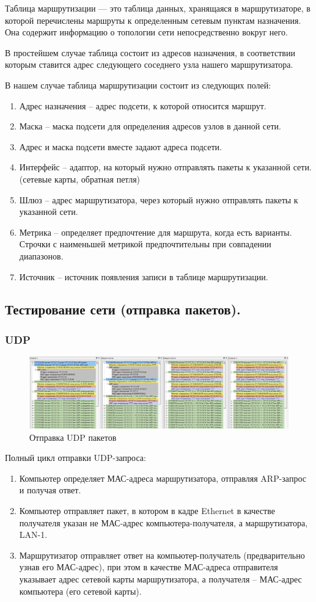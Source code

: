 \documentclass[12pt,onecolumn]{article}
\begin{document}
Таблица маршрутизации — это таблица данных, хранящаяся в маршрутизаторе, в которой перечислены маршруты к определенным сетевым пунктам назначения. Она содержит информацию о топологии сети непосредственно вокруг него.

В простейшем случае таблица состоит из адресов назначения, в соответствии которым ставится адрес следующего соседнего узла нашего маршрутизатора.

В нашем случае таблица маршрутизации состоит из следующих полей:
\begin{enumerate}
  \item Адрес назначения -- адрес подсети, к которой относится маршрут.
  \item Маска -- маска подсети для определения адресов узлов в данной сети.
  \item Адрес и маска подсети вместе задают адреса подсети.
  \item Интерфейс -- адаптор, на который нужно отправлять пакеты к указанной сети. (сетевые карты, обратная петля)
  \item Шлюз -- адрес маршрутизатора, через который нужно отправлять пакеты к указанной сети.
  \item Метрика --  определяет предпочтение для маршрута, когда есть варианты. Строчки с наименьшей метрикой предпочтительны при совпадении диапазонов.
  \item Источник -- источник появления записи в таблице маршрутизации.
\end{enumerate}

\subsection*{Тестирование сети (отправка пакетов).}
\subsubsection*{UDP}
\begin{figure}[H]
    \centering
    \includegraphics[width=\textwidth]{image/part-1/udp.png}
    \caption{Отправка UDP пакетов}
\end{figure}
Полный цикл отправки UDP-запроса:
\begin{enumerate}
    \item Компьютер определяет МАС-адреса маршрутизатора, отправляя ARP-запрос и получая ответ.
    \item Компьютер отправляет пакет, в котором в кадре Ethernet в качестве получателя указан не МАС-адрес компьютера-получателя, а маршрутизатора, LAN-1.
    \item Маршрутизатор отправляет ответ на компьютер-получатель (предварительно узнав его МАС-адрес), при этом в качестве МАС-адреса отправителя указывает адрес сетевой карты маршрутизатора, а получателя – МАС-адрес компьютера (его сетевой карты).
\end{enumerate}
\end{document}
